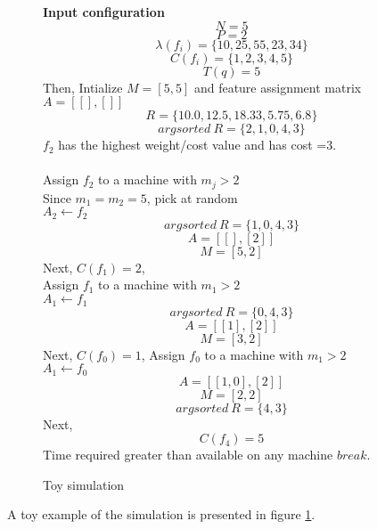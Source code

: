 \documentclass[10pt, conference, compsocconf]{IEEEtran}
\begin{document}
\begin{figure}[h!]
\begin{framed}
\begin{scriptsize}
\begin{spacing}{0.5}
\textbf{Input configuration}
$$N =5$$
$$P=2$$
$$\lambda(f_i) =\{10,25,55,23,34\}$$
$$C(f_i)= \{1,2,3,4,5\}$$
$$T(q)=5$$
Then,
Intialize $M=[5,5]$ and feature assignment matrix $A=[[],[]]$\\
$$R =\{10.0, 12.5, 18.33, 5.75, 6.8\}$$
$$argsorted\ R= \{2,1,0,4,3\}$$
$f_2$ has the highest weight/cost value and has cost =3.\\\\
Assign $f_2$ to a machine with $m_j >2$\\
Since $m_1 =m_2=5$, pick at random\\
$A_2 \leftarrow f_2$
$$argsorted\ R= \{1,0,4,3\}$$
$$A =[[], [2]]$$
$$M =[5, 2]$$
Next, $C(f_1) =2$,\\
Assign $f_1$ to a machine with $m_1 >2$\\
$A_1 \leftarrow f_1$
$$argsorted\ R= \{0,4,3\}$$
$$A =[[1], [2]]$$
$$M =[3, 2]$$
Next, $C(f_0) =1$,
Assign $f_0$ to a machine with $m_1 >2$\\
$A_1 \leftarrow f_0$\\
$$A =[[1, 0], [2]]$$
$$M =[2, 2]$$
$$argsorted\ R= \{4,3\}$$
Next,
$$C(f_4) =5$$
Time required greater than available on any machine $break$.
\end{spacing}
\end{scriptsize}
\end{framed}
\label{fig:1}
\caption{Toy simulation}
\end{figure}




A toy example of the simulation is presented in figure \ref{fig:1}.
\end{document}
